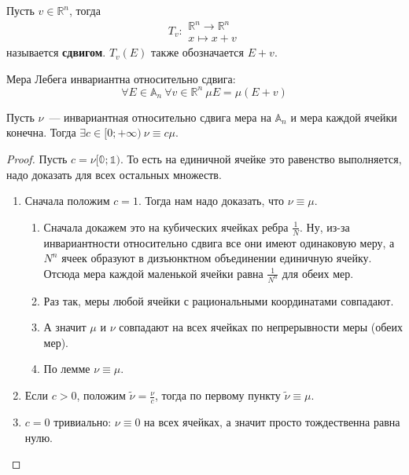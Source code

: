 \documentclass{article}
\begin{document}
    \begin{definition}
        Пусть $v\in\mathbb R^n$, тогда
        $$
        T_v\colon\substack{\mathbb R^n\to\mathbb R^n\\x\mapsto x+v}
        $$
        называется \textbf{сдвигом}. $T_v(E)$ также обозначается $E+v$.
    \end{definition}
    \begin{corollary}
        \label{Инвариантность меры Лебега относительно сдвига}
        Мера Лебега инвариантна относительно сдвига:
        $$
        \forall E\in\mathbb A_n~\forall v\in\mathbb R^n~\mu E=\mu(E+v)
        $$
    \end{corollary}
    \begin{theorem}
        \label{Меры, инвариантные относительно сдвига}
        Пусть $\nu$~--- инвариантная относительно сдвига мера на $\mathbb A_n$ и мера каждой ячейки конечна. Тогда $\exists c\in[0;+\infty)~\nu\equiv c\mu$.
    \end{theorem}
    \begin{proof}
        Пусть $c=\nu[\mathbb0;\mathbb1)$. То есть на единичной ячейке это равенство выполняется, надо доказать для всех остальных множеств.
        \begin{enumerate}
            \item Сначала положим $c=1$. Тогда нам надо доказать, что $\nu\equiv\mu$.
            \begin{enumerate}
                \item Сначала докажем это на кубических ячейках ребра $\frac1N$. Ну, из-за инвариантности относительно сдвига все они имеют одинаковую меру, а $N^n$ ячеек образуют в дизъюнктном объединении единичную ячейку. Отсюда мера каждой маленькой ячейки равна $\frac1{N^n}$ для обеих мер.
                \item Раз так, меры любой ячейки с рациональными координатами совпадают.
                \item А значит $\mu$ и $\nu$ совпадают на всех ячейках по непрерывности меры (обеих мер).
                \item По лемме $\nu\equiv\mu$.
            \end{enumerate}
            \item Если $c>0$, положим $\tilde\nu=\frac\nu c$, тогда по первому пункту $\tilde\nu\equiv\mu$.
            \item $c=0$ тривиально: $\nu\equiv0$ на всех ячейках, а значит просто тождественна равна нулю.
        \end{enumerate}
    \end{proof}
\end{document}
